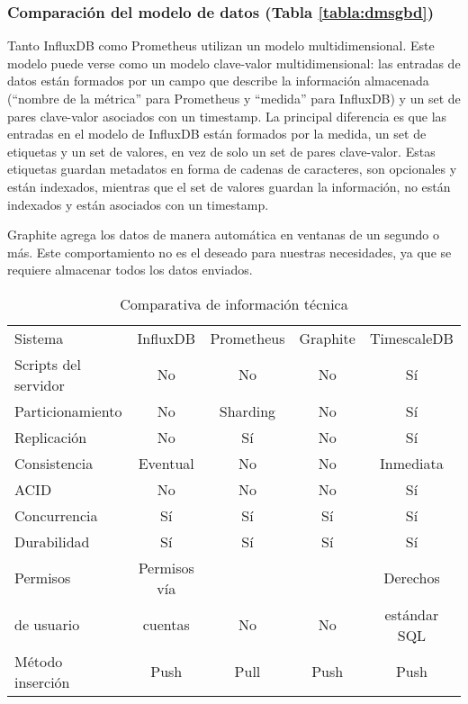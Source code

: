 \subsubsection{Comparación del modelo de datos (Tabla \ref{tabla:dmsgbd})} Tanto InfluxDB como Prometheus utilizan un modelo 
multidimensional. Este modelo puede verse como un modelo clave-valor multidimensional: las entradas de datos están formados 
por un campo que describe la información almacenada (``nombre de la métrica'' para Prometheus y ``medida'' para InfluxDB) 
y un set de pares clave-valor asociados con un timestamp. La principal diferencia es que las entradas en el modelo de InfluxDB 
están formados por la medida, un set de etiquetas y un set de valores, en vez de solo un set de pares clave-valor. 
Estas etiquetas guardan metadatos en forma de cadenas de caracteres, son opcionales y están indexados, mientras que el set de 
valores guardan la información, no están indexados y están asociados con un timestamp.

Graphite agrega los datos de manera automática en ventanas de un segundo o más. Este comportamiento no es el deseado 
para nuestras necesidades, ya que se requiere almacenar todos los datos enviados.

\begin{table}[H]
    \begin{center}
        \begin{adjustbox}{max width=\textwidth}
            \begin{tabular}{l c c c c}
                \toprule
                Sistema & InfluxDB & Prometheus & Graphite & TimescaleDB \\
                \otoprule
                Scripts del servidor & No & No & No & Sí \\
                \rowcolor{gray!35}
                Particionamiento & No & Sharding & No & Sí \\
                Replicación & No & Sí & No & Sí \\
                \rowcolor{gray!35}
                Consistencia & Eventual & No & No & Inmediata \\
                ACID& No & No & No & Sí \\
                \rowcolor{gray!35}
                Concurrencia & Sí & Sí & Sí & Sí \\
                Durabilidad & Sí & Sí & Sí & Sí \\
                \rowcolor{gray!35}
                Permisos                   & Permisos vía    &                      &                      & Derechos \\
                \rowcolor{gray!35}
                de usuario & cuentas & \multirow{-2}{*}{No} & \multirow{-2}{*}{No} & estándar SQL \\
                Método inserción & Push & Pull & Push & Push \\
                \bottomrule
            \end{tabular}
        \end{adjustbox}
        \caption{Comparativa de información técnica}
        \label{tabla:tisgbd}
    \end{center}
\end{table}

